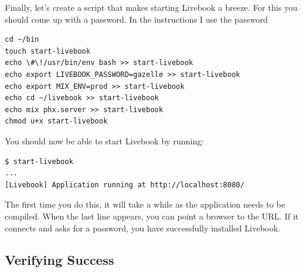 Finally, let's create a script that makes starting Livebook a breeze. For this you should come up with a password. In the instructions I use the password 

\begin{verbatim}
cd ~/bin
touch start-livebook
echo \#\!/usr/bin/env bash >> start-livebook
echo export LIVEBOOK_PASSWORD=gazelle >> start-livebook
echo export MIX_ENV=prod >> start-livebook
echo cd ~/livebook >> start-livebook
echo mix phx.server >> start-livebook
chmod u+x start-livebook
\end{verbatim}

You should now be able to start Livebook by running:

\begin{verbatim}
$ start-livebook
...
[Livebook] Application running at http://localhost:8080/
\end{verbatim}

The first time you do this, it will take a while as the application needs to be compiled. When the last line appears, you can point a browser to the URL. If it connects and asks for a password, you have successfully installed Livebook.

\subsection{Verifying Success}
